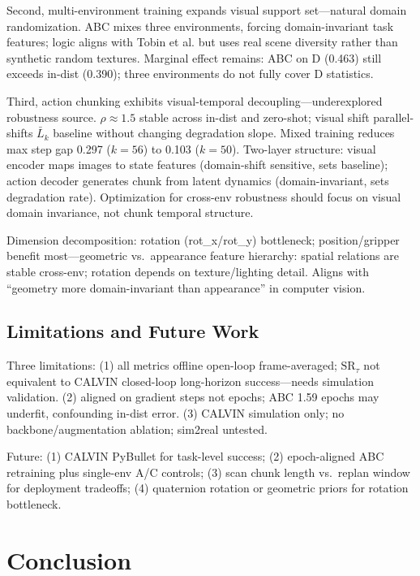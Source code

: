 \documentclass[10pt,twocolumn,letterpaper]{article}
\begin{document}
Second, multi-environment training expands visual support set---natural domain randomization. ABC mixes three environments, forcing domain-invariant task features; logic aligns with Tobin et al.\cite{tobin2017domain} but uses real scene diversity rather than synthetic random textures. Marginal effect remains: ABC on D (0.463) still exceeds in-dist (0.390); three environments do not fully cover D statistics.

Third, action chunking exhibits visual-temporal decoupling---underexplored robustness source. $\rho\approx1.5$ stable across in-dist and zero-shot; visual shift parallel-shifts $\bar{L}_k$ baseline without changing degradation slope. Mixed training reduces max step gap 0.297 ($k{=}56$) to 0.103 ($k{=}50$). Two-layer structure: visual encoder maps images to state features (domain-shift sensitive, sets baseline); action decoder generates chunk from latent dynamics (domain-invariant, sets degradation rate). Optimization for cross-env robustness should focus on visual domain invariance, not chunk temporal structure.

Dimension decomposition: rotation (rot\_x/rot\_y) bottleneck; position/gripper benefit most---geometric vs.\ appearance feature hierarchy: spatial relations are stable cross-env; rotation depends on texture/lighting detail. Aligns with ``geometry more domain-invariant than appearance'' in computer vision.

\subsection{Limitations and Future Work}

Three limitations: (1) all metrics offline open-loop frame-averaged; $\mathrm{SR}_\tau$ not equivalent to CALVIN closed-loop long-horizon success---needs simulation validation. (2) aligned on gradient steps not epochs; ABC 1.59 epochs may underfit, confounding in-dist error. (3) CALVIN simulation only; no backbone/augmentation ablation; sim2real untested.

Future: (1) CALVIN PyBullet for task-level success; (2) epoch-aligned ABC retraining plus single-env A/C controls; (3) scan chunk length vs.\ replan window for deployment tradeoffs; (4) quaternion rotation or geometric priors for rotation bottleneck.

\section{Conclusion}
\end{document}
